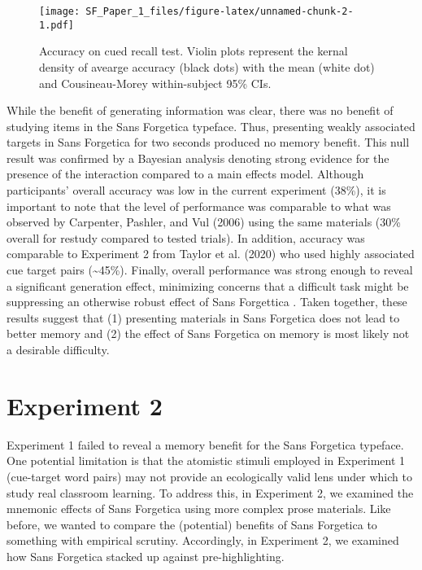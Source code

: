 \documentclass[
  english,
  jou]{apa6}
\begin{document}
\begin{figure}
\centering
\texttt{[image: SF\_Paper\_1\_files/figure-latex/unnamed-chunk-2-1.pdf]}
\caption{\label{fig:unnamed-chunk-2}Accuracy on cued recall test. Violin plots represent the kernal density of avearge accuracy (black dots) with the mean (white dot) and Cousineau-Morey within-subject 95\% CIs.}
\end{figure}

While the benefit of generating information was clear, there was no benefit of studying items in the Sans Forgetica typeface. Thus, presenting weakly associated targets in Sans Forgetica for two seconds produced no memory benefit. This null result was confirmed by a Bayesian analysis denoting strong evidence for the presence of the interaction compared to a main effects model. Although participants' overall accuracy was low in the current experiment (38\%), it is important to note that the level of performance was comparable to what was observed by Carpenter, Pashler, and Vul (2006) using the same materials (30\% overall for restudy compared to tested trials). In addition, accuracy was comparable to Experiment 2 from Taylor et al. (2020) who used highly associated cue target pairs (\textasciitilde45\%). Finally, overall performance was strong enough to reveal a significant generation effect, minimizing concerns that a difficult task might be suppressing an otherwise robust effect of Sans Forgettica . Taken together, these results suggest that (1) presenting materials in Sans Forgetica does not lead to better memory and (2) the effect of Sans Forgetica on memory is most likely not a desirable difficulty.

\hypertarget{experiment-2}{%
\section{Experiment 2}\label{experiment-2}}

Experiment 1 failed to reveal a memory benefit for the Sans Forgetica typeface. One potential limitation is that the atomistic stimuli employed in Experiment 1 (cue-target word pairs) may not provide an ecologically valid lens under which to study real classroom learning. To address this, in Experiment 2, we examined the mnemonic effects of Sans Forgetica using more complex prose materials. Like before, we wanted to compare the (potential) benefits of Sans Forgetica to something with empirical scrutiny. Accordingly, in Experiment 2, we examined how Sans Forgetica stacked up against pre-highlighting.
\end{document}
